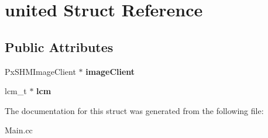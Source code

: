 \hypertarget{structunited}{
\section{united Struct Reference}
\label{structunited}
}
\subsection*{Public Attributes}
\begin{DoxyCompactItemize}
\item 
\hypertarget{structunited_a0a86e81de4e56baa346e3b7da7ba9242}{
PxSHMImageClient $\ast$ {\bfseries imageClient}}
\label{structunited_a0a86e81de4e56baa346e3b7da7ba9242}

\item 
\hypertarget{structunited_a03d460dd68c20d42ceef65d4ebabc4cb}{
lcm\_\-t $\ast$ {\bfseries lcm}}
\label{structunited_a03d460dd68c20d42ceef65d4ebabc4cb}

\end{DoxyCompactItemize}


The documentation for this struct was generated from the following file:\begin{DoxyCompactItemize}
\item 
Main.cc\end{DoxyCompactItemize}
